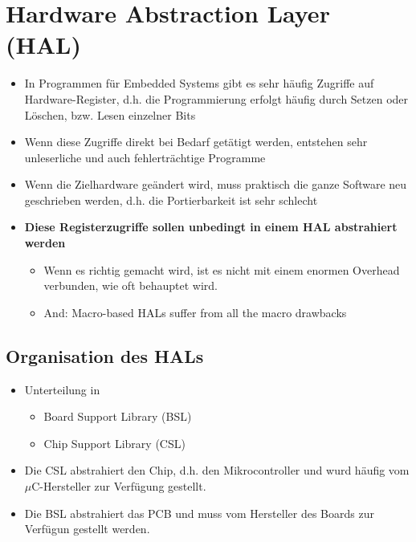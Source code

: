 \section{Hardware Abstraction Layer (HAL)}
\begin{itemize}
  \item In Programmen für Embedded Systems gibt es sehr häufig Zugriffe auf Hardware-Register, d.h. die Programmierung erfolgt häufig durch Setzen oder Löschen, bzw. Lesen einzelner Bits
  \item Wenn diese Zugriffe direkt bei Bedarf getätigt werden, entstehen sehr unleserliche und auch fehlerträchtige Programme
  \item Wenn die Zielhardware geändert wird, muss praktisch die ganze Software neu geschrieben werden, d.h. die Portierbarkeit ist sehr schlecht
  \item \textbf{Diese Registerzugriffe sollen unbedingt in einem HAL abstrahiert werden}
  \begin{itemize}
    \item Wenn es richtig gemacht wird, ist es nicht mit einem enormen Overhead verbunden, wie oft behauptet wird.
    \item And: Macro-based HALs suffer from all the macro drawbacks
  \end{itemize}
\end{itemize}

\subsection{Organisation des HALs}
\begin{itemize}
  \item Unterteilung in
  \begin{itemize}
    \item Board Support Library (BSL)
    \item Chip Support Library (CSL)
  \end{itemize}
  \item Die CSL abstrahiert den Chip, d.h. den Mikrocontroller und wurd häufig vom $\mu$C-Hersteller zur Verfügung gestellt.
  \item Die BSL abstrahiert das PCB und muss vom Hersteller des Boards zur Verfügun gestellt werden.
\end{itemize}

